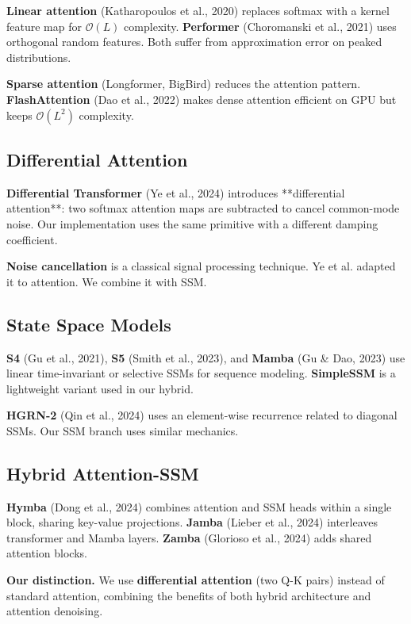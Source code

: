 \textbf{Linear attention} (Katharopoulos et al., 2020) replaces softmax with a 
kernel feature map for $\mathcal{O}(L)$ complexity. \textbf{Performer} 
(Choromanski et al., 2021) uses orthogonal random features. Both suffer 
from approximation error on peaked distributions.

\textbf{Sparse attention} (Longformer, BigBird) reduces the attention pattern. 
\textbf{FlashAttention} (Dao et al., 2022) makes dense attention efficient on 
GPU but keeps $\mathcal{O}(L^2)$ complexity.

\subsection{Differential Attention}

\textbf{Differential Transformer} (Ye et al., 2024) introduces **differential 
attention**: two softmax attention maps are subtracted to cancel 
common-mode noise. Our implementation uses the same primitive with a 
different damping coefficient.

\textbf{Noise cancellation} is a classical signal processing technique. Ye et al. 
adapted it to attention. We combine it with SSM.

\subsection{State Space Models}

\textbf{S4} (Gu et al., 2021), \textbf{S5} (Smith et al., 2023), and \textbf{Mamba} (Gu \& 
Dao, 2023) use linear time-invariant or selective SSMs for sequence 
modeling. \textbf{SimpleSSM} is a lightweight variant used in our hybrid.

\textbf{HGRN-2} (Qin et al., 2024) uses an element-wise recurrence related to 
diagonal SSMs. Our SSM branch uses similar mechanics.

\subsection{Hybrid Attention-SSM}

\textbf{Hymba} (Dong et al., 2024) combines attention and SSM heads within a 
single block, sharing key-value projections. \textbf{Jamba} (Lieber et al., 2024) 
interleaves transformer and Mamba layers. \textbf{Zamba} (Glorioso et al., 2024) 
adds shared attention blocks.

\textbf{Our distinction.} We use \textbf{differential attention} (two Q-K pairs) 
instead of standard attention, combining the benefits of both hybrid 
architecture and attention denoising.

